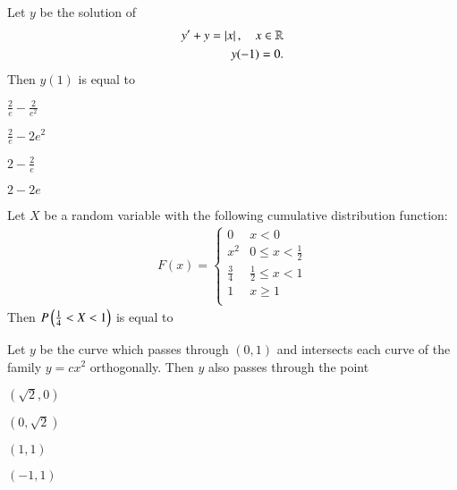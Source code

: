 \documentclass[journal]{IEEEtran}
\numberwithin{equation}{enumi}
\numberwithin{figure}{enumi}
\begin{document}
\begin{enumerate}
{\hfill{}

\item Let $y$ be the solution of
\begin{align*}
y' + y = \left\vert x\right\vert, \quad x \in \mathbb{R} \\
y(-1) = 0.
\end{align*}
Then $y(1)$ is equal to

\begin{enumerate}
\begin{multicols}{2}
\item $\frac{2}{e} - \frac{2}{e^2}$
\item $\frac{2}{e} - 2 e^2$
\item $2 - \frac{2}{e}$
\item $2 - 2e$
\end{multicols}
\end{enumerate}

\hfill{}

\item Let $X$ be a random variable with the following cumulative distribution function:
\begin{align*}
F(x) = 
\begin{cases}
0 & x < 0 \\
x^2 & 0 \leq x < \frac{1}{2} \\
\frac{3}{4} & \frac{1}{2} \leq x < 1 \\
1 & x \geq 1 \\
\end{cases}
\end{align*}
Then $P\left( \frac{1}{4} < X < 1 \right)$ is equal to \underline

\hfill{}

\item Let $y$ be the curve which passes through $(0,1)$ and intersects each curve of the family $y = c x^2$ orthogonally. Then $y$ also passes through the point

\begin{enumerate}
\begin{multicols}{2}
\item $(\sqrt{2}, 0)$
\item $(0, \sqrt{2})$
\item $(1, 1)$
\item $(-1, 1)$
\end{multicols}
\end{enumerate}

\hfill{}

}
\end{enumerate}
\end{document}
